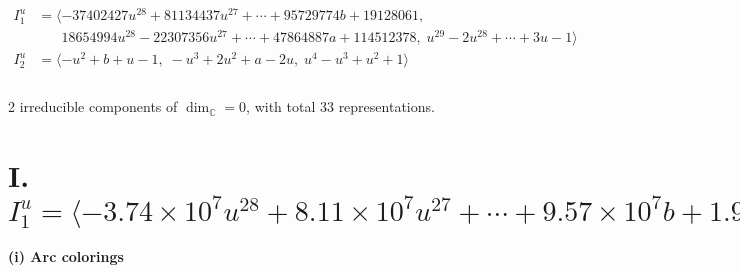 \documentclass[1p]{elsarticle_modified}
\theoremstyle{definition}
\begin{document}
\begin{align*}
I^u_{1}&=\langle 
-37402427 u^{28}+81134437 u^{27}+\cdots+95729774 b+19128061,\\
\phantom{I^u_{1}}&\phantom{= \langle  }18654994 u^{28}-22307356 u^{27}+\cdots+47864887 a+114512378,\;u^{29}-2 u^{28}+\cdots+3 u-1\rangle \\
I^u_{2}&=\langle 
- u^2+b+u-1,\;- u^3+2 u^2+a-2 u,\;u^4- u^3+u^2+1\rangle \\
\\
\end{align*}
\raggedright * 2 irreducible components of $\dim_{\mathbb{C}}=0$, with total 33 representations.\\
\newpage
\renewcommand{\arraystretch}{1}
\centering \section*{I. $I^u_{1}= \langle -3.74\times10^{7} u^{28}+8.11\times10^{7} u^{27}+\cdots+9.57\times10^{7} b+1.91\times10^{7},\;1.87\times10^{7} u^{28}-2.23\times10^{7} u^{27}+\cdots+4.79\times10^{7} a+1.15\times10^{8},\;u^{29}-2 u^{28}+\cdots+3 u-1 \rangle$}
\flushleft \textbf{(i) Arc colorings}\\
\end{document}
